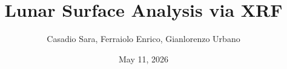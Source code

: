 \documentclass{beamer}
\title[Lunar Rover XRF Classification]{Lunar Surface Analysis via XRF}
\author{Casadio Sara, Ferraiolo Enrico, Gianlorenzo Urbano}
\institute{Alma Mater Studiorum - University of Bologna}
\date{May 11, 2026}
\begin{document}
\begin{frame}
    \titlepage
\end{frame}





\end{document}
